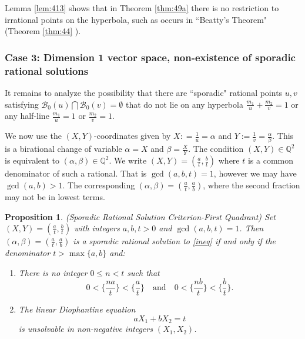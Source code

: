 \documentclass[12pt,letterpaper, reqno]{amsart}
\newtheorem{prop}[thm]{Proposition}
\theoremstyle{definition}
\theoremstyle{remark}
\newcommand{\QQ}{\mathbb{Q}}
\newcommand{\sB}{{\mathcal B}}
\begin{document}
Lemma \ref{lem:413} shows that  in Theorem \ref{thm:49a}
there is no restriction to irrational points on the hyperbola, such as
 occurs  in ``Beatty's Theorem" (Theorem \ref{thm:44} ).


\subsubsection{Case 3: Dimension 1 vector space, non-existence of sporadic rational solutions }\label{sec:444}


It remains to analyze  the possibility that there are ``sporadic" rational points $u, v$
satisfying $\sB_0(u) \bigcap \sB_0(v)= \emptyset$
 that do not lie on any hyperbola 
$\frac{m_1}{u} + \frac{m_2}{v} =1$
or any half-line $\frac{m_1}{u}=1$ or $\frac{m_2}{v} =1$.



We now use the $(X, Y)$-coordinates given by $X: = \frac{1}{u}= \alpha$ and
$Y := \frac{1}{v} = \frac{\alpha}{\beta}$. This is a birational change of variable
$\alpha = X$ and $\beta =\frac{X}{Y}$.
The condition $(X, Y) \in \QQ^2$ is equivalent to $(\alpha, \beta) \in \QQ^2$.
We write $(X, Y) = (\frac{a}{t}, \frac{b}{t})$ where $t$ is a common denominator of 
such a rational. That is $\gcd(a, b, t) =1$, however we may have $\gcd(a, b) >1$.
The corresponding $(\alpha, \beta) = (\frac{a}{t}, \frac{a}{b})$, where the second
fraction may not be in lowest terms. 



\begin{prop} \label{prop:414aa}
{ \rm (Sporadic Rational Solution Criterion-First Quadrant)}
Set   $(X, Y)= (\frac{a}{t}, \frac{b}{t})$ with integers $a,b, t >0$ and $\gcd(a, b, t)=1$.
Then $(\alpha, \beta)=(\frac{a}{t}, \frac{a}{b})$ is a sporadic rational solution to \eqref{ineq}  if and only if 
the denominator $t > \max\{a, b\}$ and:
\begin{enumerate}
\item[(i)]
There is no integer $0 \le n < t$ such that
$$
0 < \{ \frac{na}{t}\} <  \{ \frac{a}{t}\} \quad \mbox{and} \quad  0 < \{ \frac{nb}{t}\} <  \{ \frac{b}{t}\}.
$$

\item[(ii)]
The linear
Diophantine equation 
\begin{equation}\label{eq:Frob2}
a X_1 + bX_2= t
\end{equation}
is unsolvable in non-negative integers $(X_1,X_2)$. 
\end{enumerate}
\end{prop}
\end{document}
